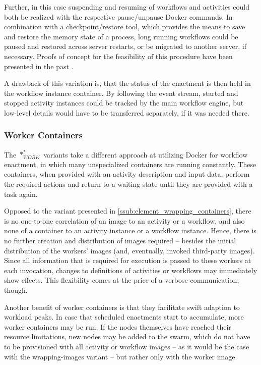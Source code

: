     Further, in this case suspending and resuming of workflows and activities could both be realized with the respective pause/unpause Docker commands. In combination with a checkpoint/restore tool, which provides the means to save and restore the memory state of a process, long running workflows could be paused and restored across server restarts, or be migrated to another server, if necessary. Proofs of concept for the feasibility of this procedure have been presented in the past \cite{Kim2015Checkpoint,Merker2015How}.

    A drawback of this variation is, that the status of the enactment is then held in the workflow instance container. By following the event stream, started and stopped activity instances could be tracked by the main workflow engine, but low-level details would have to be transferred separately, if it was needed there.

  \subsubsection{Worker Containers} %
  \label{ssub:worker_containers}
    The $*_{WORK}^{*}$ variants take a different approach at utilizing Docker for workflow enactment, in which many unspecialized containers are running constantly. These containers, when provided with an activity description and input data, perform the required actions and return to a waiting state until they are provided with a task again.

    Opposed to the variant presented in \ref{ssub:element_wrapping_containers}, there is no one-to-one correlation of an image to an activity or a workflow, and also none of a container to an activity instance or a workflow instance. Hence, there is no further creation and distribution of images required -- besides the initial distribution of the workers' images (and, eventually, invoked third-party images).
    Since all information that is required for execution is passed to these workers at each invocation, changes to definitions of activities or workflows may immediately show effects. This flexibility comes at the price of a verbose communication, though.

    Another benefit of worker containers is that they facilitate swift adaption to workload peaks. In case that scheduled enactments start to accumulate, more worker containers may be run. If the nodes themselves have reached their resource limitations, new nodes may be added to the swarm, which do not have to be provisioned with all activity or workflow images -- as it would be the case with the wrapping-images variant -- but rather only with the worker image.

